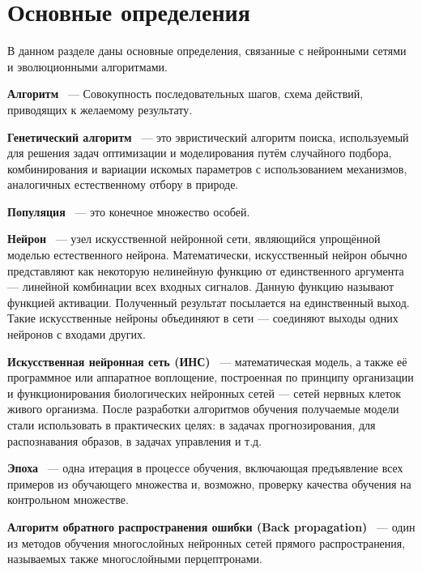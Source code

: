 \section{Основные определения}
\indent \indent В данном разделе даны основные определения, связанные с нейронными сетями и эволюционными алгоритмами.

 \textbf{Алгоритм} ~--- Совокупность последовательных шагов, схема действий, приводящих к желаемому результату. 

 \textbf{Генетический алгоритм} ~--- это эвристический алгоритм поиска, используемый для решения задач оптимизации и моделирования путём случайного подбора, комбинирования и вариации искомых параметров с использованием механизмов, аналогичных естественному отбору в природе.

 \textbf{Популяция} ~--- это конечное множество особей.

 \textbf{Нейрон} ~--- узел искусственной нейронной сети, являющийся упрощённой моделью естественного нейрона. Математически, искусственный нейрон обычно представляют как некоторую нелинейную функцию от единственного аргумента — линейной комбинации всех входных сигналов. Данную функцию называют функцией активации. Полученный результат посылается на единственный выход. Такие искусственные нейроны объединяют в сети — соединяют выходы одних нейронов с входами других. 

 \textbf{Искусственная нейронная сеть (ИНС)}  ~--- математическая модель, а также её программное или аппаратное воплощение, построенная по принципу организации и функционирования биологических нейронных сетей — сетей нервных клеток живого организма. После разработки алгоритмов обучения получаемые модели стали использовать в практических целях: в задачах прогнозирования, для распознавания образов, в задачах управления и т.д. 

 \textbf{Эпоха} ~--- одна итерация в процессе обучения, включающая предъявление всех примеров из обучающего множества и, возможно, проверку качества обучения на контрольном множестве. 

 \textbf{Алгоритм обратного распространения ошибки (Back propagation)} ~--- один из методов обучения многослойных нейронных сетей прямого распространения, называемых также многослойными перцептронами.